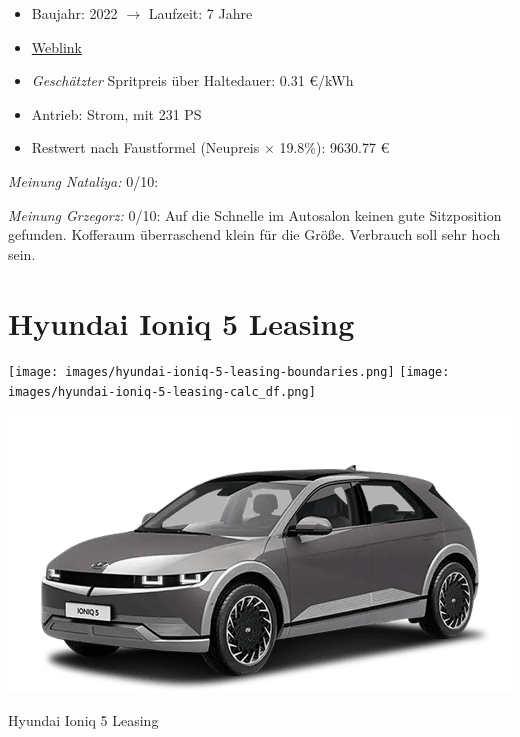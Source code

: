 \documentclass[landscape, DIV=99, 14pt]{scrartcl}
\begin{document}
\begin{itemize}
    \item Baujahr: 2022 $\rightarrow$ Laufzeit: 7 Jahre
    \item \href{https://konfigurator.meinauto.de/hyundai/neuwagen/ioniq/angebote/ioniq-5/konfigurator/\#!/extras/-/8865700/14,19,41/private/104690-6897-293274/4864/61e90b0c48e55/cash-purchase/104690-6897-293274/24,9000,15000,0,0,0,0,0,}{Weblink}
    \item \emph{Gesch\"atzter} Spritpreis \"uber Haltedauer: 0.31 \euro{}/kWh
    \item Antrieb: Strom, mit 231 PS
    \item Restwert nach Faustformel (Neupreis $\times$ 19.8\%): 9630.77 \euro{}
\end{itemize}

\begin{small}
\emph{Meinung Nataliya:} 0/10: 
        
\emph{Meinung Grzegorz:} 0/10: Auf die Schnelle im Autosalon keinen gute Sitzposition gefunden. Kofferaum \"uberraschend klein f\"ur die Gr\"o\ss{}e. Verbrauch soll sehr hoch sein.
\end{small}

\pagebreak


\twocolumn

\section*{Hyundai Ioniq 5 Leasing}
\begin{center}
\texttt{[image: images/hyundai-ioniq-5-leasing-boundaries.png]}
\null
\vspace{0.5cm}
\texttt{[image: images/hyundai-ioniq-5-leasing-calc\_df.png]}
\end{center}

\pagebreak
\begin{center}
\includegraphics[width=0.9\columnwidth]{cars/hyundai-ioniq-5.png}

Hyundai Ioniq 5 Leasing
\end{center}
\end{document}

